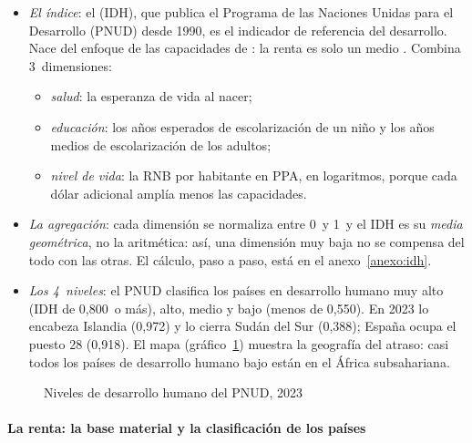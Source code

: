 \documentclass[11pt]{article}
\begin{document}
\begin{itemize}
\item \emph{El índice}: el  (IDH), que publica el Programa de las Naciones Unidas para el Desarrollo (PNUD) desde 1990, es el indicador de referencia del desarrollo. Nace del enfoque de las capacidades de : la renta es solo un medio\nocite{PNUD1990Human,Sen1985Commodities} . Combina 3~dimensiones:
  \begin{itemize}
  \item \emph{salud}: la esperanza de vida al nacer;
  \item \emph{educación}: los años esperados de escolarización de un niño y los años medios de escolarización de los adultos;
  \item \emph{nivel de vida}: la RNB por habitante en PPA, en logaritmos, porque cada dólar adicional amplía menos las capacidades.
  \end{itemize}
\item \emph{La agregación}: cada dimensión se normaliza entre 0~y 1~y el IDH es su \emph{media geométrica}, no la aritmética: así, una dimensión muy baja no se compensa del todo con las otras\nocite{PNUD2025NotasTecnicas}. El cálculo, paso a paso, está en el anexo~\ref{anexo:idh}.
\item \emph{Los 4~niveles}: el PNUD clasifica los países en desarrollo humano muy alto (IDH de 0,800~o más), alto, medio y bajo (menos de 0,550). En 2023 lo encabeza Islandia (0,972) y lo cierra Sudán del Sur (0,388); España ocupa el puesto 28 (0,918). El mapa (gráfico~\ref{fig:mapa-idh}) muestra la geografía del atraso: casi todos los países de desarrollo humano bajo están en el África subsahariana\nocite{PNUD2025IDH}.
\end{itemize}

\begin{figure}[H]
\centering
\caption{Niveles de desarrollo humano del PNUD, 2023}\label{fig:mapa-idh}
\end{figure}

\paragraph{La renta: la base material y la clasificación de los países}
\end{document}

